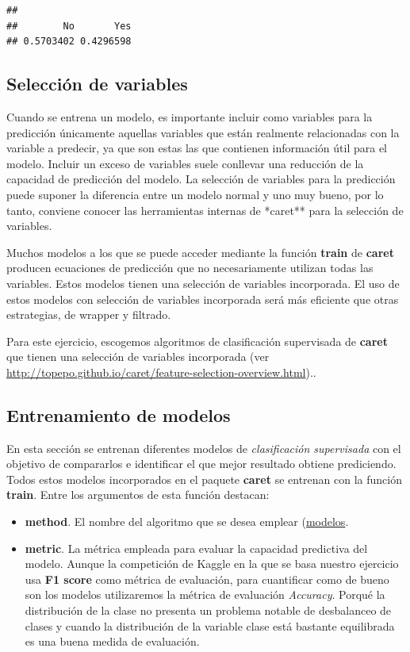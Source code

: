 \documentclass[]{article}
\begin{document}
\begin{verbatim}
## 
##        No       Yes 
## 0.5703402 0.4296598
\end{verbatim}

\hypertarget{selecciuxf3n-de-variables}{%
\subsection{Selección de variables}\label{selecciuxf3n-de-variables}}

Cuando se entrena un modelo, es importante incluir como variables para
la predicción únicamente aquellas variables que están realmente
relacionadas con la variable a predecir, ya que son estas las que
contienen información útil para el modelo. Incluir un exceso de
variables suele conllevar una reducción de la capacidad de predicción
del modelo. La selección de variables para la predicción puede suponer
la diferencia entre un modelo normal y uno muy bueno, por lo tanto,
conviene conocer las herramientas internas de *caret** para la selección
de variables.

Muchos modelos a los que se puede acceder mediante la función
\textbf{train} de \textbf{caret} producen ecuaciones de predicción que
no necesariamente utilizan todas las variables. Estos modelos tienen una
selección de variables incorporada. El uso de estos modelos con
selección de variables incorporada será más eficiente que otras
estrategias, de wrapper y filtrado.

Para este ejercicio, escogemos algoritmos de clasificación supervisada
de \textbf{caret} que tienen una selección de variables incorporada (ver
\url{http://topepo.github.io/caret/feature-selection-overview.html})..

\hypertarget{entrenamiento-de-modelos}{%
\subsection{Entrenamiento de modelos}\label{entrenamiento-de-modelos}}

En esta sección se entrenan diferentes modelos de \emph{clasificación
supervisada} con el objetivo de compararlos e identificar el que mejor
resultado obtiene prediciendo. Todos estos modelos incorporados en el
paquete \textbf{caret} se entrenan con la función \textbf{train}. Entre
los argumentos de esta función destacan:

\begin{itemize}
\item
  \textbf{method}. El nombre del algoritmo que se desea emplear
  (\href{http://topepo.github.io/caret/available-models.html}{modelos}.
\item
  \textbf{metric}. La métrica empleada para evaluar la capacidad
  predictiva del modelo. Aunque la competición de Kaggle en la que se
  basa nuestro ejercicio usa \textbf{F1 score} como métrica de
  evaluación, para cuantificar como de bueno son los modelos
  utilizaremos la métrica de evaluación \emph{Accuracy}. Porqué la
  distribución de la clase no presenta un problema notable de
  desbalanceo de clases y cuando la distribución de la variable clase
  está bastante equilibrada es una buena medida de evaluación.
\end{itemize}
\end{document}
